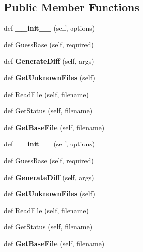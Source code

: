 \subsection*{Public Member Functions}
\begin{DoxyCompactItemize}
\item 
\mbox{\label{classupload_1_1_subversion_v_c_s_a8333f94e27335ce83eed0cc3f5a1eeb0}} 
def {\bfseries \+\_\+\+\_\+init\+\_\+\+\_\+} (self, options)
\item 
def \hyperlink{classupload_1_1_subversion_v_c_s_a7d22d459469a757270502ce0dccacbd2}{Guess\+Base} (self, required)
\item 
\mbox{\label{classupload_1_1_subversion_v_c_s_a07c2d341f2c7df2772dd7f85e89b0212}} 
def {\bfseries Generate\+Diff} (self, args)
\item 
\mbox{\label{classupload_1_1_subversion_v_c_s_a494ba1010992d83cac015bc396ab693a}} 
def {\bfseries Get\+Unknown\+Files} (self)
\item 
def \hyperlink{classupload_1_1_subversion_v_c_s_a340d269b74386ac863636f6b0683d9f4}{Read\+File} (self, filename)
\item 
def \hyperlink{classupload_1_1_subversion_v_c_s_ac3785eb1fa561088206d01570f9fe982}{Get\+Status} (self, filename)
\item 
\mbox{\label{classupload_1_1_subversion_v_c_s_a29dec4941de0824734d6842a2f33ffc3}} 
def {\bfseries Get\+Base\+File} (self, filename)
\item 
\mbox{\label{classupload_1_1_subversion_v_c_s_a8333f94e27335ce83eed0cc3f5a1eeb0}} 
def {\bfseries \+\_\+\+\_\+init\+\_\+\+\_\+} (self, options)
\item 
def \hyperlink{classupload_1_1_subversion_v_c_s_a7d22d459469a757270502ce0dccacbd2}{Guess\+Base} (self, required)
\item 
\mbox{\label{classupload_1_1_subversion_v_c_s_a07c2d341f2c7df2772dd7f85e89b0212}} 
def {\bfseries Generate\+Diff} (self, args)
\item 
\mbox{\label{classupload_1_1_subversion_v_c_s_a494ba1010992d83cac015bc396ab693a}} 
def {\bfseries Get\+Unknown\+Files} (self)
\item 
def \hyperlink{classupload_1_1_subversion_v_c_s_a340d269b74386ac863636f6b0683d9f4}{Read\+File} (self, filename)
\item 
def \hyperlink{classupload_1_1_subversion_v_c_s_ac3785eb1fa561088206d01570f9fe982}{Get\+Status} (self, filename)
\item 
\mbox{\label{classupload_1_1_subversion_v_c_s_a29dec4941de0824734d6842a2f33ffc3}} 
def {\bfseries Get\+Base\+File} (self, filename)
\end{DoxyCompactItemize}
